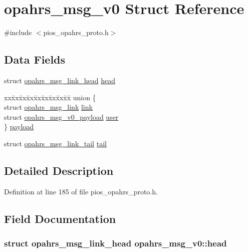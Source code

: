 \hypertarget{structopahrs__msg__v0}{\section{opahrs\-\_\-msg\-\_\-v0 Struct Reference}
\label{structopahrs__msg__v0}
}


{\ttfamily \#include $<$pios\-\_\-opahrs\-\_\-proto.\-h$>$}

\subsection*{Data Fields}
\begin{DoxyCompactItemize}
\item 
struct \hyperlink{structopahrs__msg__link__head}{opahrs\-\_\-msg\-\_\-link\-\_\-head} \hyperlink{structopahrs__msg__v0_adccac27210f7f95b05f147c722794be3}{head}
\item 
\begin{tabbing}
xx\=xx\=xx\=xx\=xx\=xx\=xx\=xx\=xx\=\kill
union \{\\
\>struct \hyperlink{structopahrs__msg__link}{opahrs\_msg\_link} \hyperlink{structopahrs__msg__v0_a0042c0b5e5ed2d74a40d5abc2bb8817f}{link}\\
\>struct \hyperlink{structopahrs__msg__v0__payload}{opahrs\_msg\_v0\_payload} \hyperlink{structopahrs__msg__v0_a04283c93537e31a776223a755f849b50}{user}\\
\} \hyperlink{structopahrs__msg__v0_a5d8bf554da50c900e0fcdad24cfae84e}{payload}\\

\end{tabbing}\item 
struct \hyperlink{structopahrs__msg__link__tail}{opahrs\-\_\-msg\-\_\-link\-\_\-tail} \hyperlink{structopahrs__msg__v0_a53d292d779748ac79bb2690b25417d12}{tail}
\end{DoxyCompactItemize}


\subsection{Detailed Description}


Definition at line 185 of file pios\-\_\-opahrs\-\_\-proto.\-h.



\subsection{Field Documentation}
\hypertarget{structopahrs__msg__v0_adccac27210f7f95b05f147c722794be3}{
\subsubsection[{head}]{\setlength{\rightskip}{0pt plus 5cm}struct {\bf opahrs\-\_\-msg\-\_\-link\-\_\-head} opahrs\-\_\-msg\-\_\-v0\-::head}}\label{structopahrs__msg__v0_adccac27210f7f95b05f147c722794be3}


